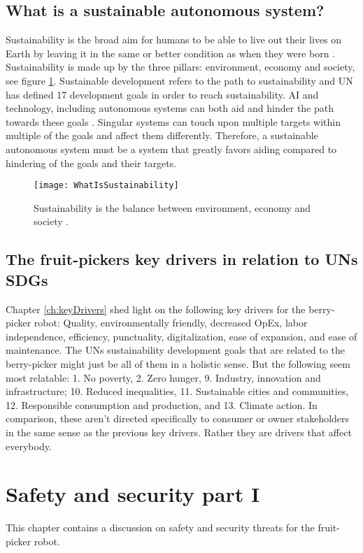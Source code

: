 \documentclass[%
oneside,    %
project,    %
nosummary   %
]{USN-MSc}
\begin{document}
\section{What is a sustainable autonomous system?}
Sustainability is the broad aim for humans to be able to live out their lives on Earth by leaving it in the same or better condition as when they were born \cite{enwiki:1113015553}. Sustainability is made up by the three pillars: environment, economy and society, see figure \ref{fig:whatIsSus}. Sustainable development refers to the path to sustainability and UN has defined 17 development goals in order to reach sustainability. AI and technology, including autonomous systems can both aid and hinder the path towards these goals \cite{vinuesa2020role}. Singular systems can touch upon multiple targets within multiple of the goals and affect them differently. Therefore, a sustainable autonomous system must be a system that greatly favors aiding compared to hindering of the goals and their targets.

\begin{figure}[!ht]
  \centering
  \texttt{[image: WhatIsSustainability]}
  \caption{Sustainability is the balance between environment, economy and society \cite{enwiki:1113015553}.}
  \label{fig:whatIsSus}
\end{figure}

\section{The fruit-pickers key drivers in relation to UNs SDGs}
Chapter \ref{ch:keyDrivers} shed light on the following key drivers for the berry-picker robot: Quality, environmentally friendly, decreased OpEx, labor independence, efficiency, punctuality, digitalization, ease of expansion, and ease of maintenance.
The UNs sustainability development goals that are related to the berry-picker might just be all of them in a holistic sense. But the following seem most relatable: 1. No poverty, 2. Zero hunger, 9. Industry, innovation and infrastructure; 10. Reduced inequalities, 11. Sustainable cities and communities, 12. Responsible consumption and production, and 13. Climate action.
In comparison, these aren't directed specifically to consumer or owner stakeholders in the same sense as the previous key drivers. Rather they are drivers that affect everybody.

\chapter{Safety and security part I}
\label{ch:safety1}
This chapter contains a discussion on safety and security threats for the fruit-picker robot.
\end{document}
